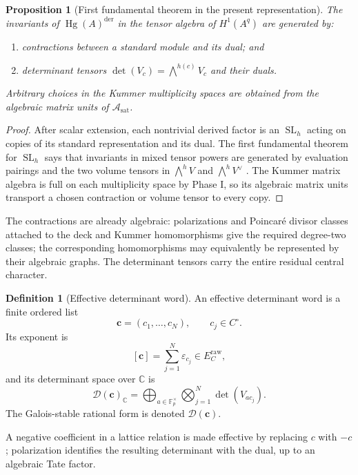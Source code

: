 \documentclass[11pt]{article}
\newtheorem{proposition}[theorem]{Proposition}
\theoremstyle{definition}
\newtheorem{definition}[theorem]{Definition}
\theoremstyle{remark}
\newcommand{\F}{\mathbb F}
\newcommand{\C}{\mathbb C}
\newcommand{\A}{\mathcal A}
\newcommand{\Hg}{\operatorname{Hg}}
\newcommand{\SL}{\operatorname{SL}}
\newcommand{\eps}{\varepsilon}
\newcommand{\raw}{\mathrm{raw}}
\newcommand{\sat}{\mathrm{sat}}
\newcommand{\der}{\mathrm{der}}
\begin{document}
\begin{proposition}[First fundamental theorem in the present representation]\label{prop:FFT}
The invariants of $\Hg(A)^{\der}$ in the tensor algebra of $H^1(A^q)$ are generated by:
\begin{enumerate}[label=\textup{(\alph*)}]
\item contractions between a standard module and its dual; and
\item determinant tensors $\det(V_c)=\bigwedge^{h(c)}V_c$ and their duals.
\end{enumerate}
Arbitrary choices in the Kummer multiplicity spaces are obtained from the algebraic matrix units of $\A_{\sat}$.
\end{proposition}

\begin{proof}
After scalar extension, each nontrivial derived factor is an $\SL_h$ acting on copies of its standard representation and its dual.  The first fundamental theorem for $\SL_h$ says that invariants in mixed tensor powers are generated by evaluation pairings and the two volume tensors in $\bigwedge^hV$ and $\bigwedge^hV^\vee$ \cite{Weyl}.  The Kummer matrix algebra is full on each multiplicity space by Phase I, so its algebraic matrix units transport a chosen contraction or volume tensor to every copy.
\end{proof}

The contractions are already algebraic: polarizations and Poincar\'e divisor classes attached to the deck and Kummer homomorphisms give the required degree-two classes; the corresponding homomorphisms may equivalently be represented by their algebraic graphs.  The determinant tensors carry the entire residual central character.

\begin{definition}[Effective determinant word]\label{def:word}
An effective determinant word is a finite ordered list
\[
 \mathbf c=(c_1,\ldots,c_N),\qquad c_j\in C^\circ.
\]
Its exponent is
\[
 [\mathbf c]=\sum_{j=1}^N\eps_{c_j}\in E_C^{\raw},
\]
and its determinant space over $\C$ is
\begin{equation}\label{eq:det-space-complex}
 \mathcal D(\mathbf c)_\C=
 \bigoplus_{a\in\F_p^\times}
 \bigotimes_{j=1}^N\det(V_{ac_j}).
\end{equation}
The Galois-stable rational form is denoted $\mathcal D(\mathbf c)$.
\end{definition}

A negative coefficient in a lattice relation is made effective by replacing $c$ with $-c$; polarization identifies the resulting determinant with the dual, up to an algebraic Tate factor.
\end{document}
